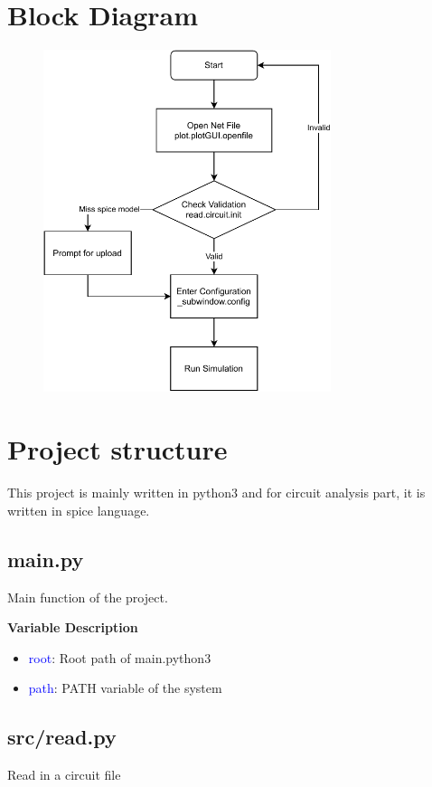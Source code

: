 \documentclass[12pt,a4paper]{article}
\begin{document}
\section{Block Diagram}
\begin{figure}[ht]
    \centering
    \includegraphics[width=0.75\textwidth]{Image/spice.pdf}
    \caption{}
\end{figure}

\section{Project structure}
This project is mainly written in python3 and for circuit analysis part, it is written in spice language.

\subsection{main.py}
Main function of the project.

\noindent\textbf{Variable Description}
\begin{itemize}
    \item \textcolor{blue}{root}: Root path of main.python3
    \item \textcolor{blue}{path}: PATH variable of the system
\end{itemize}

\subsection{src/read.py}
Read in a circuit file
\end{document}
